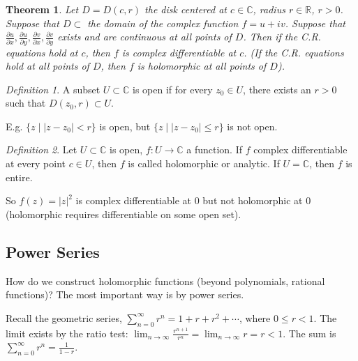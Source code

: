 \documentclass{article}
\theoremstyle{plain}
\newtheorem{theorem}{Theorem}
\theoremstyle{remark}
\newtheorem{definition}{Definition}
\newcommand{\R}{{\mathbb R}}
\newcommand{\C}{{\mathbb C}}
\begin{document}
\begin{theorem}
	Let $D = D(c,r)$ the disk centered at $c \in \C$, radius $r \in \R$, $r > 0$.
	Suppose that $D \subset$ the domain of the complex function $f = u + iv$.
	Suppose that $\frac{\partial u}{\partial x},\frac{\partial u}{\partial y},
	\frac{\partial v}{\partial x},\frac{\partial v}{\partial y}$
	exists and are continuous at all points of $D$.
	Then if the C.R. equations hold at $c$, then $f$ is complex differentiable at $c$.
	(If the C.R. equations hold at all points of $D$,
	then $f$ is holomorphic at all points of $D$).
\end{theorem}

\begin{definition}
	A subset $U \subset \C$ is open if
	for every $z_0 \in U$, there exists an $r > 0$ such that $D(z_0,r) \subset U$.
\end{definition}
E.g. $\{z \mid |z - z_0| < r\}$ is open, but
$\{z \mid |z - z_0| \leq r\}$ is not open.

\begin{definition}
	Let $U \subset \C$ is open, $f \colon U \to \C$ a function.
	If $f$ complex differentiable at every point $c \in U$, then $f$ is called
	holomorphic or analytic.
	If $U = \C$, then $f$ is entire.
\end{definition}
So $f(z) = |z|^2$ is complex differentiable at $0$ but not holomorphic at $0$
(holomorphic requires differentiable on some open set).

\subsection{Power Series}
How do we construct holomorphic functions
(beyond polynomials, rational functions)?
The most important way is by power series.

Recall the geometric series,
$\sum_{n = 0}^\infty r^n = 1 + r + r^2 + \cdots$, where $0 \leq r < 1$.
The limit exists by the ratio test: $\lim_{n\to\infty} \frac{r^{n+1}}{r^n}
= \lim_{n\to\infty} r = r < 1$.
The sum is $\sum_{n=0}^\infty r^n = \frac{1}{1-r}$.
\end{document}
